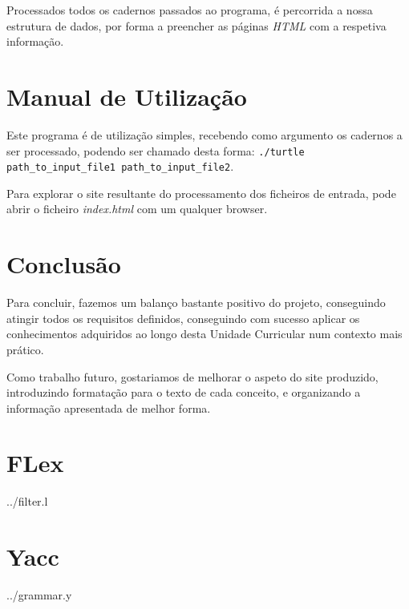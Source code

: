 \documentclass[a4paper]{report}
\begin{document}
Processados todos os cadernos passados ao programa, é percorrida a nossa
estrutura de dados, por forma a preencher as páginas \textit{HTML} com a
respetiva informação.

\chapter{Manual de Utilização}

Este programa é de utilização simples, recebendo como argumento os cadernos a ser processado, 
podendo ser chamado desta forma: 
\verb!./turtle path_to_input_file1 path_to_input_file2!.

Para explorar o site resultante do processamento dos ficheiros de entrada, pode
abrir o ficheiro \textit{index.html} com um qualquer browser.

\chapter{Conclusão}

Para concluir, fazemos um balanço bastante positivo do projeto, conseguindo
atingir todos os requisitos definidos, conseguindo com sucesso aplicar os
conhecimentos adquiridos ao longo desta Unidade Curricular num contexto mais
prático.

Como trabalho futuro, gostariamos de melhorar o aspeto do site produzido,
introduzindo formatação para o texto de cada conceito, e organizando a
informação apresentada de melhor forma.

\appendix

\chapter{FLex}

{../filter.l}

\chapter{Yacc} \label{apx:yacc}

{../grammar.y}
\end{document}
